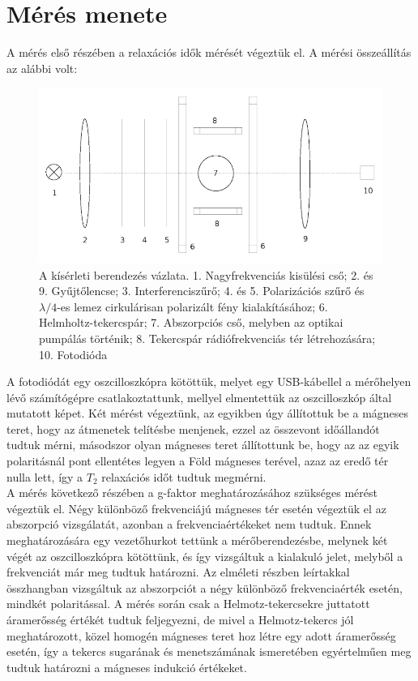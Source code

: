 \documentclass[12pt,a4paper]{article}
\begin{document}
\section{Mérés menete}
\hspace*{10pt} A mérés első részében a relaxációs idők mérését végeztük el. A mérési összeállítás az alábbi volt:
\begin{figure}[!h]
\hspace*{-0.5cm}
\includegraphics[scale=0.5]{osszeall.png}
\caption{A kísérleti berendezés vázlata. 1. Nagyfrekvenciás kisülési cső; 2. és 9. Gyűjtőlencse; 3. Interferenciszűrő; 4. és 5. Polarizációs szűrő és $\lambda/4$-es lemez cirkulárisan polarizált fény kialakításához; 6. Helmholtz-tekercspár; 7. Abszorpciós cső, melyben az optikai pumpálás történik; 8. Tekercspár rádiófrekvenciás tér létrehozására; 10. Fotodióda}
\end{figure}
\newline
A fotodiódát egy oszcilloszkópra kötöttük, melyet egy USB-kábellel a mérőhelyen lévő számítógépre csatlakoztattunk, mellyel elmentettük az oszcilloszkóp által mutatott képet. Két mérést végeztünk, az egyikben úgy állítottuk be a mágneses teret, hogy az átmenetek telítésbe menjenek, ezzel az összevont időállandót tudtuk mérni, másodszor olyan mágneses teret állítottunk be, hogy az az egyik polaritásnál pont ellentétes legyen a Föld mágneses terével, azaz az eredő tér nulla lett, így a $T_2$ relaxációs időt tudtuk megmérni.\\
\hspace*{10pt} A mérés következő részében a g-faktor meghatározásához szükséges mérést végeztük el. Négy különböző frekvenciájú mágneses tér esetén végeztük el az abszorpció vizsgálatát, azonban a frekvenciaértékeket nem tudtuk. Ennek meghatározására egy vezetőhurkot tettünk a mérőberendezésbe, melynek két végét az oszcilloszkópra kötöttünk, és így vizsgáltuk a kialakuló jelet, melyből a frekvenciát már meg tudtuk határozni.
\newpage
\hspace*{10pt} Az elméleti részben leírtakkal összhangban vizsgáltuk az abszorpciót a négy különböző frekvenciaérték esetén, mindkét polaritással. A mérés során csak a Helmotz-tekercsekre juttatott áramerősség értékét tudtuk feljegyezni, de mivel a Helmotz-tekercs jól meghatározott, közel homogén mágneses teret hoz létre egy adott áramerősség esetén, így a tekercs sugarának és menetszámának ismeretében egyértelműen meg tudtuk határozni a mágneses indukció értékeket.
\end{document}
